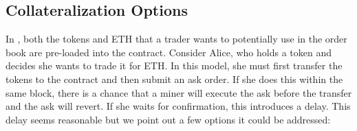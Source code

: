 
\subsection{Collateralization Options}

In \cm, both the tokens and ETH that a trader wants to potentially use in the order book are pre-loaded into the contract. Consider Alice, who holds a token and decides she wants to trade it for ETH. In this model, she must first transfer the tokens to the contract and then submit an ask order. If she does this within the same block, there is a chance that a miner will execute the ask before the transfer and the ask will revert. If she waits for confirmation, this introduces a delay. This delay seems reasonable but we point out a few options it could be addressed:

